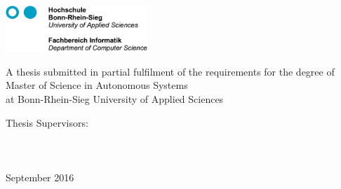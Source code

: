 \begin{titlepage}
\raggedright
\includegraphics[width=0.4\textwidth]{pictures/FH-Header.jpg}\\
\centering
\vspace*{1in}
\begin{Large}\bfseries
\PaperSubject \par
\end{Large}
\vspace{1.2in}
\begin{LARGE}\bfseries
 \par
\end{LARGE}
\vspace{0.5in}
\begin{large}
\PaperMainWriter%
 \par
\end{large}
\vspace{0.5in}
A thesis submitted in partial fulfilment of the requirements for the degree of
Master of Science in Autonomous Systems \\
at Bonn-Rhein-Sieg University of Applied Sciences
\vfill
\vspace{0.5in}
\par
\vfill
Thesis Supervisors:\\
\ThesisReferee \\ %
\ThesisExReferee \\ %
\ThesisAdvisor \\
\vspace{0.4in} %
September 2016

\end{titlepage}




